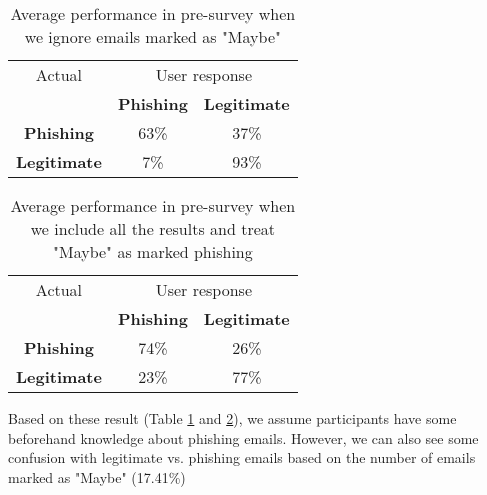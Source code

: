 \begin{table}[!ht]
    \begin{center}

        \begin{tabular}{c | c c}
            Actual              & \multicolumn{2}{c}{User response}                       \\
                                & \textbf{Phishing}                 & \textbf{Legitimate} \\
            \textbf{Phishing}   & 63\%                              & 37\%                \\
            \textbf{Legitimate} & 7\%                               & 93\%                \\
        \end{tabular}
        \caption[Average performance in pre-survey (I)]{Average performance in pre-survey when we ignore emails marked as "Maybe"}
        \label{tab:pre_survey_responses}
    \end{center}
\end{table}

\begin{table}[!ht]
    \begin{center}

        \begin{tabular}{c | c c}
            Actual              & \multicolumn{2}{c}{User response}                       \\
                                & \textbf{Phishing}                 & \textbf{Legitimate} \\
            \textbf{Phishing}   & 74\%                              & 26\%                \\
            \textbf{Legitimate} & 23\%                              & 77\%                \\
        \end{tabular}
        \caption[Average performance in pre-survey (II)]{Average performance in pre-survey when we include all the results and treat "Maybe" as marked phishing}
        \label{tab:pre_survey_responses_all}
    \end{center}
\end{table}

Based on these result (Table \ref{tab:pre_survey_responses} and \ref{tab:pre_survey_responses_all}), we assume participants have some  beforehand knowledge about phishing emails. However, we can also see some confusion with legitimate vs. phishing emails based on the number of emails marked as "Maybe" (17.41\%)

